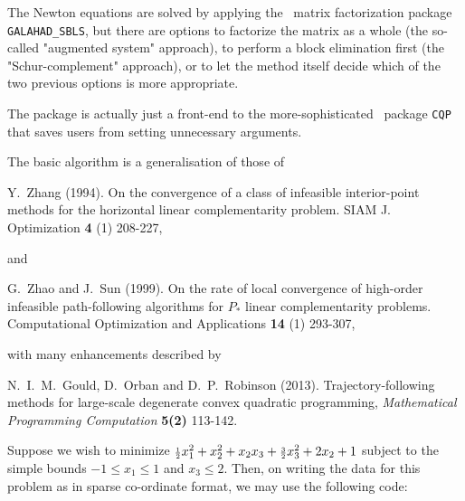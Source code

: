 \documentclass{galahad}
\begin{document}
The Newton equations are solved  by applying the
\galahad\ matrix factorization package
{\tt GALAHAD\_SBLS}, but there are options
to factorize the matrix as a whole (the so-called "augmented system"
approach), to perform a block elimination first (the "Schur-complement"
approach), or to let the method itself decide which of the two
previous options is more appropriate.

The package is actually just a front-end to the 
more-sophisticated \galahad\ package {\tt CQP} that saves users
from setting unnecessary arguments.

\vspace*{1mm}

\galreferences
\vspace*{1mm}

\noindent
The basic algorithm is a generalisation of those of
\vspace*{1mm}

\noindent
Y.\ Zhang (1994).
On the convergence of a class of infeasible interior-point methods for the
horizontal linear complementarity problem.
SIAM J. Optimization {\bf 4} (1) 208-227,
\vspace*{1mm}

\noindent
and

\noindent
G.\ Zhao and J.\ Sun (1999).
On the rate of local convergence of high-order
infeasible path-following algorithms for $P_*$ linear complementarity
problems.
Computational Optimization and Applications {\bf 14} (1) 293-307,
\vspace*{1mm}

\noindent
with many enhancements described by
\vspace*{1mm}

\noindent
N.\ I.\ M.\ Gould, D.\ Orban and D.\ P.\ Robinson (2013).
Trajectory-following methods for
large-scale  degenerate convex quadratic programming,
{\em Mathematical Programming Computation} {\bf 5(2)} 113-142.


\galexample
Suppose we wish to minimize
${\scriptstyle \frac{1}{2}} x_1^2 + x_2^2 + x_2 x_3 + {\scriptstyle \frac{3}{2}} x_3^2 + 2 x_2 + 1$
subject to the simple bounds
$-1  \leq  x_{1}  \leq  1$ and $x_{3}  \leq  2$.
Then, on writing the data for this problem as
in sparse co-ordinate format, we may use the following code:
\end{document}
